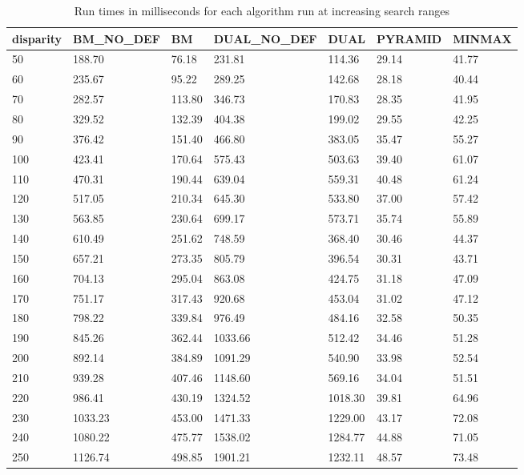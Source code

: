 \begin{table}
    \begin{tabular}{|l|l|l|l|l|l|l|}
        \hline
        disparity & BM\_NO\_DEF & BM     & DUAL\_NO\_DEF & DUAL    & PYRAMID & MINMAX \\ \hline
        50 & 188.70    & 76.18  & 231.81      & 114.36  & 29.14   & 41.77          \\
        60 & 235.67    & 95.22  & 289.25      & 142.68  & 28.18   & 40.44          \\
        70 & 282.57    & 113.80 & 346.73      & 170.83  & 28.35   & 41.95          \\
        80 & 329.52    & 132.39 & 404.38      & 199.02  & 29.55   & 42.25          \\
        90 & 376.42    & 151.40 & 466.80      & 383.05  & 35.47   & 55.27          \\
        100 & 423.41    & 170.64 & 575.43      & 503.63  & 39.40   & 61.07          \\
       110 & 470.31    & 190.44 & 639.04      & 559.31  & 40.48   & 61.24          \\
        120 & 517.05    & 210.34 & 645.30      & 533.80  & 37.00   & 57.42          \\
        130 & 563.85    & 230.64 & 699.17      & 573.71  & 35.74   & 55.89          \\
        140 & 610.49    & 251.62 & 748.59      & 368.40  & 30.46   & 44.37          \\
        150 & 657.21    & 273.35 & 805.79      & 396.54  & 30.31   & 43.71          \\
        160 & 704.13    & 295.04 & 863.08      & 424.75  & 31.18   & 47.09          \\
        170 & 751.17    & 317.43 & 920.68      & 453.04  & 31.02   & 47.12          \\
        180 & 798.22    & 339.84 & 976.49      & 484.16  & 32.58   & 50.35          \\
        190 & 845.26    & 362.44 & 1033.66     & 512.42  & 34.46   & 51.28          \\
        200 & 892.14    & 384.89 & 1091.29     & 540.90  & 33.98   & 52.54          \\
        210 & 939.28    & 407.46 & 1148.60     & 569.16  & 34.04   & 51.51          \\
        220 & 986.41    & 430.19 & 1324.52     & 1018.30 & 39.81   & 64.96          \\
        230 & 1033.23   & 453.00 & 1471.33     & 1229.00 & 43.17   & 72.08          \\
        240 & 1080.22   & 475.77 & 1538.02     & 1284.77 & 44.88   & 71.05          \\
        250 & 1126.74   & 498.85 & 1901.21     & 1232.11 & 48.57   & 73.48          \\
        \hline
    \end{tabular}
    \caption{Run times in milliseconds for each algorithm run at
      increasing search ranges}
\end{table}


